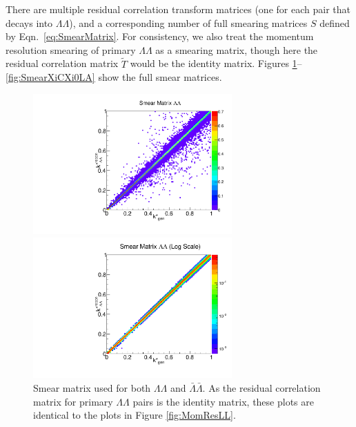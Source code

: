 There are multiple residual correlation transform matrices (one for each pair that decays into $\Lambda\Lambda$), and a corresponding number of full smearing matrices $S$ defined by Eqn.\ \ref{eq:SmearMatrix}.
For consistency, we also treat the momentum resolution smearing of primary $\Lambda\Lambda$ as a smearing matrix, though here the residual correlation matrix $\tilde{T}$ would be the identity matrix. 
Figures \ref{fig:SmearLLAA}--\ref{fig:SmearXiCXi0LA} show the full smear matrices.

\begin{figure}[h]
\begin{minipage}{18pc}
\includegraphics[width=18pc]{Figures/SmearMatrices/2016-7-19-SmearMatrixLambdaLambdaNormLLAA.pdf}
\end{minipage}\hspace{2pc}
\begin{minipage}{18pc}
\includegraphics[width=18pc]{Figures/SmearMatrices/2016-7-19-SmearMatrixLambdaLambdaNormLLAALog.pdf}
\end{minipage} 
\caption[Smear matrix -- $\Lambda\Lambda$]{\label{fig:SmearLLAA} 
Smear matrix used for both $\Lambda\Lambda$ and $\bar{\Lambda}\bar{\Lambda}$. As the residual correlation matrix for primary $\Lambda\Lambda$ pairs is the identity matrix, these plots are identical to the plots in Figure \ref{fig:MomResLL}.}
\end{figure}

